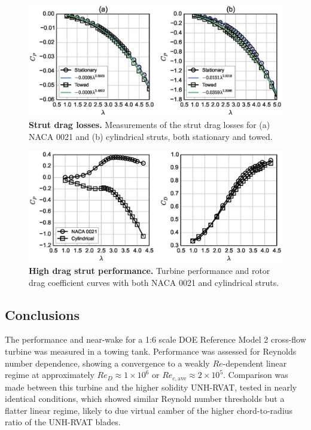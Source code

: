 \documentclass[10pt,letterpaper]{article}
\begin{document}
\begin{figure}[ht!]
    \includegraphics[width=\textwidth]{figures/no_blades_all.eps}

    \caption{{\bf Strut drag losses.} Measurements of the strut drag losses for
    (a) NACA 0021 and (b) cylindrical struts, both stationary and towed.}

    \label{fig:no-blades}
\end{figure}


\begin{figure}[ht!]
    \includegraphics[width=\textwidth]{figures/perf_covers.eps}

    \caption{{\bf High drag strut performance.} Turbine performance and rotor
    drag coefficient curves with both NACA 0021 and cylindrical struts.}

    \label{fig:perf-covers}
\end{figure}


\subsection*{Conclusions}

The performance and near-wake for a 1:6 scale DOE Reference Model 2 cross-flow
turbine was measured in a towing tank. Performance was assessed for Reynolds
number dependence, showing a convergence to a weakly $Re$-dependent linear
regime at approximately $Re_D \approx 1 \times 10^6$ or $Re_{c,\mathrm{ave}}
\approx 2 \times 10^5$. Comparison was made between this turbine and the higher
solidity UNH-RVAT, tested in nearly identical conditions, which showed similar
Reynold number thresholds but a flatter linear regime, likely to due virtual
camber of the higher chord-to-radius ratio of the UNH-RVAT blades.
\end{document}
